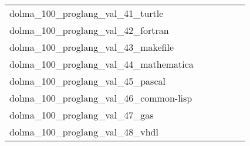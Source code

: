 {\begin{longtable}{m{6cm}m{1.7cm}m{1.7cm}m{1.7cm}m{1.7cm}m{1.7cm}}
	dolma\_100\_proglang\_val\_41\_turtle  & \colorbox[HTML]{77c578}{\makebox[\mywidth][c]{2.35}} & \colorbox[HTML]{d3eda0}{\makebox[\mywidth][c]{2.45}} & \colorbox[HTML]{ffffe5}{\makebox[\mywidth][c]{3.17}} & \colorbox[HTML]{a7da8b}{\makebox[\mywidth][c]{2.39}} & \colorbox[HTML]{7ac779}{\makebox[\mywidth][c]{2.35}}\\
	dolma\_100\_proglang\_val\_42\_fortran  & \colorbox[HTML]{91d183}{\makebox[\mywidth][c]{2.32}} & \colorbox[HTML]{e5f4ab}{\makebox[\mywidth][c]{2.39}} & \colorbox[HTML]{ffffe5}{\makebox[\mywidth][c]{2.83}} & \colorbox[HTML]{bae294}{\makebox[\mywidth][c]{2.35}} & \colorbox[HTML]{77c578}{\makebox[\mywidth][c]{2.31}}\\
	dolma\_100\_proglang\_val\_43\_makefile  & \colorbox[HTML]{e3f4aa}{\makebox[\mywidth][c]{2.93}} & \colorbox[HTML]{f8fcc2}{\makebox[\mywidth][c]{3.01}} & \colorbox[HTML]{ffffe5}{\makebox[\mywidth][c]{3.51}} & \colorbox[HTML]{afdd8f}{\makebox[\mywidth][c]{2.86}} & \colorbox[HTML]{77c578}{\makebox[\mywidth][c]{2.82}}\\
	dolma\_100\_proglang\_val\_44\_mathematica  & \colorbox[HTML]{77c578}{\makebox[\mywidth][c]{10.34}} & \colorbox[HTML]{fbfdd0}{\makebox[\mywidth][c]{11.34}} & \colorbox[HTML]{ffffe5}{\makebox[\mywidth][c]{13.24}} & \colorbox[HTML]{a7da8b}{\makebox[\mywidth][c]{10.49}} & \colorbox[HTML]{d7efa2}{\makebox[\mywidth][c]{10.71}}\\
	dolma\_100\_proglang\_val\_45\_pascal  & \colorbox[HTML]{82ca7d}{\makebox[\mywidth][c]{4.18}} & \colorbox[HTML]{fdfedf}{\makebox[\mywidth][c]{4.81}} & \colorbox[HTML]{ffffe5}{\makebox[\mywidth][c]{5.49}} & \colorbox[HTML]{77c578}{\makebox[\mywidth][c]{4.17}} & \colorbox[HTML]{bae294}{\makebox[\mywidth][c]{4.27}}\\
	dolma\_100\_proglang\_val\_46\_common-lisp  & \colorbox[HTML]{77c578}{\makebox[\mywidth][c]{2.56}} & \colorbox[HTML]{ecf7b1}{\makebox[\mywidth][c]{2.71}} & \colorbox[HTML]{ffffe5}{\makebox[\mywidth][c]{3.32}} & \colorbox[HTML]{bbe395}{\makebox[\mywidth][c]{2.62}} & \colorbox[HTML]{8ccf81}{\makebox[\mywidth][c]{2.58}}\\
	dolma\_100\_proglang\_val\_47\_gas  & \colorbox[HTML]{77c578}{\makebox[\mywidth][c]{2.49}} & \colorbox[HTML]{f2fab5}{\makebox[\mywidth][c]{2.73}} & \colorbox[HTML]{ffffe5}{\makebox[\mywidth][c]{3.59}} & \colorbox[HTML]{b6e092}{\makebox[\mywidth][c]{2.57}} & \colorbox[HTML]{9bd587}{\makebox[\mywidth][c]{2.53}}\\
	dolma\_100\_proglang\_val\_48\_vhdl  & \colorbox[HTML]{82ca7d}{\makebox[\mywidth][c]{3.91}} & \colorbox[HTML]{eff8b3}{\makebox[\mywidth][c]{4.06}} & \colorbox[HTML]{ffffe5}{\makebox[\mywidth][c]{4.69}} & \colorbox[HTML]{95d284}{\makebox[\mywidth][c]{3.92}} & \colorbox[HTML]{77c578}{\makebox[\mywidth][c]{3.90}}\\

\end{longtable}}
